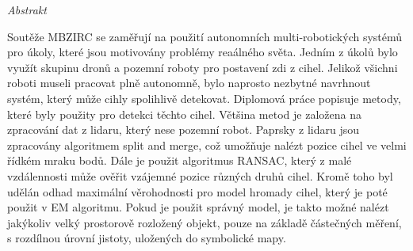 \vfill
\begin{center}
{\it \large Abstrakt}
\vspace{0.2cm}

\begin{minipage}{0.8\textwidth}{
Soutěže MBZIRC se zaměřují na použití autonomních multi-robotických systémů pro úkoly, které jsou motivovány problémy reaálného světa. Jedním z úkolů bylo využít skupinu dronů a pozemní roboty pro postavení zdi z cihel. Jelikož všichni roboti museli pracovat plně autonomně, bylo naprosto nezbytné navrhnout systém, který může cihly spolihlivě detekovat. Diplomová práce popisuje metody, které byly použity pro detekci těchto cihel. Většina metod je založena na zpracování dat z lidaru, který nese pozemní robot. Paprsky z lidaru jsou zpracovány algoritmem split and merge, což umožňuje nalézt pozice cihel ve velmi řídkém mraku bodů. Dále je použit algoritmus RANSAC, který z malé vzdálennosti může ověřit vzájemné pozice různých druhů cihel. Kromě toho byl udělán odhad maximální věrohodnosti pro model hromady cihel, který je poté použit v EM algoritmu. Pokud je použit správný model, je takto možné nalézt jakýkoliv velký prostorově rozložený objekt, pouze na základě částečných měření, s rozdílnou úrovní jistoty, uložených do symbolické mapy.

}
\end{minipage}
\end{center}
\vfill
\vspace{1cm}
\newpage{}
